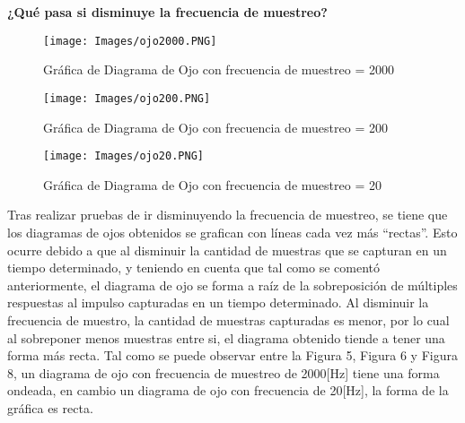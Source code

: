 \documentclass[lettersize,journal]{IEEEtran}
\begin{document}


\textbf{¿Qué pasa si disminuye la frecuencia de muestreo?}\\

\begin{figure}[h!]
    \centering
    \texttt{[image: Images/ojo2000.PNG]}
    \caption{Gráfica de Diagrama de Ojo con frecuencia de muestreo = 2000}
    \label{fig:my_label}
\end{figure}

\begin{figure}[h!]
    \centering
    \texttt{[image: Images/ojo200.PNG]}
    \caption{Gráfica de Diagrama de Ojo con frecuencia de muestreo = 200}
    \label{fig:my_label}
\end{figure}

\begin{figure}[h!]
    \centering
    \texttt{[image: Images/ojo20.PNG]}
    \caption{Gráfica de Diagrama de Ojo con frecuencia de muestreo = 20}
    \label{fig:my_label}
\end{figure}
\newpage

Tras realizar pruebas de ir disminuyendo la frecuencia de muestreo, se tiene que los diagramas de ojos obtenidos se grafican con líneas cada vez más ``rectas''. Esto ocurre debido a que al disminuir la cantidad de muestras que se capturan en un tiempo determinado, y teniendo en cuenta que tal como se comentó anteriormente, el diagrama de ojo se forma a raíz de la sobreposición de múltiples respuestas al impulso capturadas en un tiempo determinado. Al disminuir la frecuencia de muestro, la cantidad de muestras capturadas es menor, por lo cual al sobreponer menos muestras entre si, el diagrama obtenido tiende a tener una forma más recta. Tal como se puede observar entre la Figura 5, Figura 6 y Figura 8, un diagrama de ojo con frecuencia de muestreo de 2000[Hz] tiene una forma ondeada, en cambio un diagrama de ojo con frecuencia de 20[Hz], la forma de la gráfica es recta.\\
\end{document}
